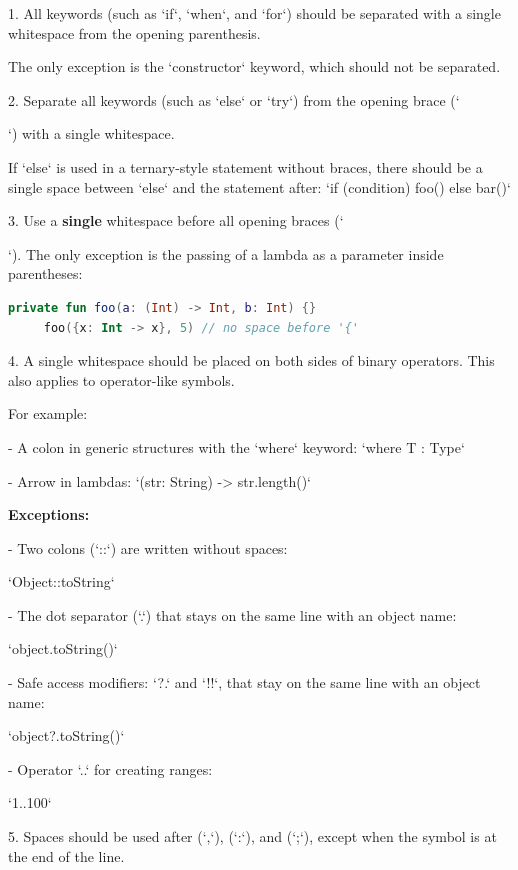 {{1.  All keywords (such as `if`, `when`, and `for`) should be separated with a single whitespace from the opening parenthesis.

    The only exception is the `constructor` keyword, which should not be separated.



2.  Separate all keywords (such as `else` or `try`) from the opening brace (`{`) with a single whitespace.

    If `else` is used in a ternary-style statement without braces, there should be a single space between `else` and the statement after: `if (condition) foo() else bar()`



3.  Use a \textbf{single} whitespace before all opening braces (`{`). The only exception is the passing of a lambda as a parameter inside parentheses:

\begin{lstlisting}[language=Kotlin]
     private fun foo(a: (Int) -> Int, b: Int) {}
     foo({x: Int -> x}, 5) // no space before '{'
\end{lstlisting}


4.  A single whitespace should be placed on both sides of binary operators. This also applies to operator-like symbols.

    For example:



 - A colon in generic structures with the `where` keyword:  `where T : Type`

 - Arrow in lambdas: `(str: String) -> str.length()`



\textbf{Exceptions:}



- Two colons (`::`) are written without spaces:\

  `Object::toString`

- The dot separator (`.`) that stays on the same line with an object name:\

  `object.toString()`

- Safe access modifiers: `?.` and `!!`, that stay on the same line with an object name:\

  `object?.toString()`

- Operator `..` for creating ranges:\

  `1..100`



5.  Spaces should be used after (`,`), (`:`), and (`;`), except when the symbol is at the end of the line.

}}}}

